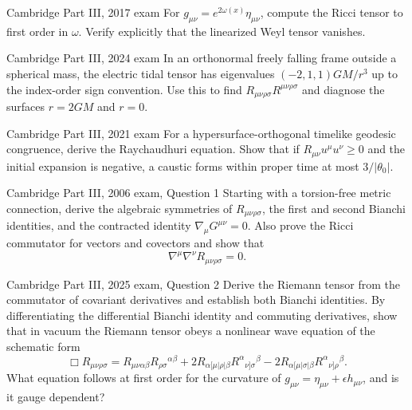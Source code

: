 \begin{exercises}
\begin{exercise}{Cambridge Part III, 2017 exam}
For \(g_{\mu\nu}=e^{2\omega(x)}\eta_{\mu\nu}\), compute the Ricci tensor to
first order in \(\omega\).  Verify explicitly that the linearized Weyl tensor
vanishes.
\end{exercise}

\begin{exercise}{Cambridge Part III, 2024 exam}
In an orthonormal freely falling frame outside a spherical mass, the electric
tidal tensor has eigenvalues
\((-2,1,1)GM/r^3\) up to the index-order sign convention.  Use this to find
\(R_{\mu\nu\rho\sigma}R^{\mu\nu\rho\sigma}\) and diagnose the surfaces
\(r=2GM\) and \(r=0\).
\end{exercise}

\begin{exercise}{Cambridge Part III, 2021 exam}
For a hypersurface-orthogonal timelike geodesic congruence, derive the
Raychaudhuri equation.  Show that if \(R_{\mu\nu}u^\mu u^\nu\geq0\) and the
initial expansion is negative, a caustic forms within proper time at most
\(3/|\theta_0|\).
\end{exercise}

\begin{exercise}{Cambridge Part III, 2006 exam, Question 1}
Starting with a torsion-free metric connection, derive the algebraic
symmetries of \(R_{\mu\nu\rho\sigma}\), the first and second Bianchi
identities, and the contracted identity
\(\nabla_\mu G^{\mu\nu}=0\).  Also prove the Ricci commutator for vectors and
covectors and show that
\[
\nabla^\mu\nabla^\nu R_{\mu\nu\rho\sigma}=0.
\]
\end{exercise}

\begin{exercise}{Cambridge Part III, 2025 exam, Question 2}
Derive the Riemann tensor from the commutator of covariant derivatives and
establish both Bianchi identities.  By differentiating the differential
Bianchi identity and commuting derivatives, show that in vacuum the Riemann
tensor obeys a nonlinear wave equation of the schematic form
\[
\Box R_{\mu\nu\rho\sigma}
=R_{\mu\nu\alpha\beta}R_{\rho\sigma}{}^{\alpha\beta}
+2R_{\alpha[\mu|\rho|\beta}
R^\alpha{}_{\nu]\sigma}{}^\beta
-2R_{\alpha[\mu|\sigma|\beta}
R^\alpha{}_{\nu]\rho}{}^\beta .
\]
What equation follows at first order for the curvature of
\(g_{\mu\nu}=\eta_{\mu\nu}+\epsilon h_{\mu\nu}\), and is it gauge
dependent?
\end{exercise}



\end{exercises}

